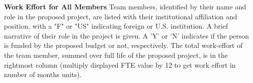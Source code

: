 \def\ProgramID{HST-xx-xxxxx (Cycle XX)} %

\begin{NOTANONhst}
\caption{\textbf{Work Effort for All Members}\hspace{1em} Team members, identified by their name and role in the proposed project, are listed with their institutional affiliation and position, with a "F" or "US" indicating foreign or U.S. institution. A brief narrative of their role in the project is given.  A 'Y' or 'N' indicates if the person is funded by the proposed budget or not, respectively.  The total work-effort of the team member, summed over full life of the proposed  project, is in the rightmost column (multiply displayed FTE value by 12 to get work effort in number of months units).}
\label{tab:NOTANONhst}
\end{NOTANONhst}

